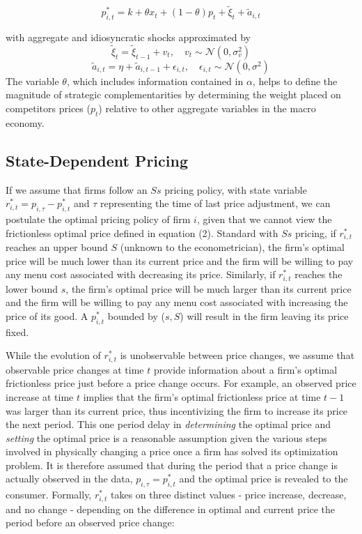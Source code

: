 \documentclass[11pt]{article}
\begin{document}
%
\begin{equation} \label{eq:2}
p^*_{i,t} = k + \theta x_{t} + (1-\theta)p_{t} + \widetilde\xi_{t} + \widetilde a_{i,t}
\end{equation}
%

with aggregate and idiosyncratic shocks approximated by
%
$$\widetilde\xi_{t} = \widetilde\xi_{t-1} + v_{t}, \quad  v_{t} 	\sim  \mathcal{N}(0,\sigma_{v}^{2})$$
$$\widetilde a_{i,t}  = \eta + \widetilde a_{i,t-1} + \epsilon_{i,t}, \quad \epsilon_{i,t} \sim  \mathcal{N}(0,\sigma^{2})$$
%
The variable $\theta$, which includes information contained in $\alpha$, helps to define the magnitude of strategic complementarities by determining the weight placed on competitors prices ($p_{t}$) relative to other aggregate variables in the macro economy.

\subsection{State-Dependent Pricing}
If we assume that firms follow an $Ss$ pricing policy, with state variable $r^{*}_{i,t} = p_{i,\tau} - p^{*}_{i,t}$ and $\tau$ representing the time of last price adjustment, we can postulate the optimal pricing policy of firm $i$, given that we cannot view the frictionless optimal price defined in equation (2). Standard with $Ss$ pricing, if $r^{*}_{i,t}$ reaches an upper bound $S$ (unknown to the econometrician), the firm's optimal price will be much lower than its current price and the firm will be willing to pay any menu cost associated with decreasing its price. Similarly, if $r^{*}_{i,t}$ reaches the lower bound $s$, the firm's optimal price will be much larger than its current price and the firm will be willing to pay any menu cost associated with increasing the price of its good. A $p^{*}_{i,t}$ bounded by ($s,S$) will result in the firm leaving its price fixed.

While the evolution of $r^{*}_{i,t}$ is unobservable between price changes, we assume that observable price changes at time $t$ provide information about a firm's optimal frictionless price just before a price change occurs. For example, an observed price increase at time $t$ implies that the firm's optimal frictionless price at time $t-1$ was larger than its current price, thus incentivizing the firm to increase its price the next period. This one period delay in \textit{determining} the optimal price and \textit{setting} the optimal price is a reasonable assumption given the various steps involved in physically changing a price once a firm has solved its optimization problem. It is therefore assumed that during the period that a price change is actually observed in the data, $p_{i,\tau} = p^{*}_{i,t}$ and the optimal price is revealed to the consumer. Formally, $r^{*}_{i,t}$ takes on three distinct values - price increase, decrease, and no change - depending on the difference in optimal and current price the period before an observed price change:
\end{document}
